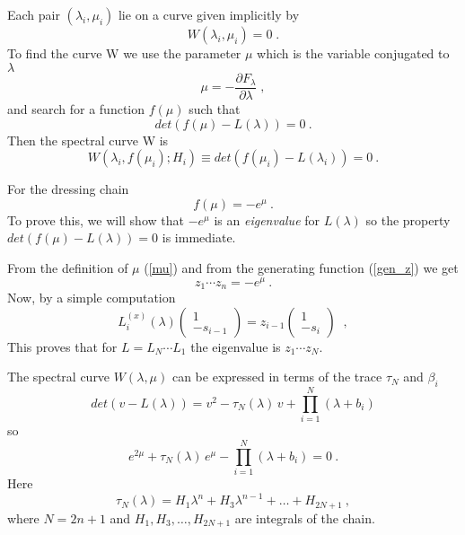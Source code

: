 \documentclass[a4paper,11pt]{article}
\begin{document}
Each pair $(\lambda_i,\mu_i)$ lie on a curve given implicitly by
\begin{equation}
\label{cu}
W(\lambda_i,\mu_i)=0\;.
\end{equation}
To find the curve W we use the parameter $\mu $ which is the variable
conjugated to $\lambda $
\begin{equation}
\label{mu}
\mu =-\frac{\partial F_{\lambda}}{\partial \lambda}\;,
\end{equation}
and search for a function $f(\mu )$ such that
\begin{equation}
\label{fmu}
det(f(\mu)-L(\lambda))=0 ~.
\end{equation}
Then the spectral curve W is
\begin{equation}
W(\lambda_i,f(\mu_i);{H_i})\equiv det(f(\mu_i)-L(\lambda_i))=0 ~.
\end{equation}

For the dressing chain
\begin{equation}
\label{f}
f(\mu)=-e^{\mu} ~.
\end{equation}
To prove this, we will show that $-e^{\mu}$ is an {\it eigenvalue} for
$L(\lambda)$ so the property $det(f(\mu)-L(\lambda))=0$ is immediate.

{}From the definition of $\mu$ (\ref{mu}) and from the generating function
(\ref{gen_z}) we get
\begin{equation}
\label{zpr}
z_1\cdots z_n=-e^{\mu} ~.
\end{equation}
Now, by a  simple computation
\begin{equation}
\label{eigenL}
L^{(x)}_i(\lambda) \left(\begin{array}{c}
          1   \\
           -s_{i-1}
         \end{array}\right )=z_{i-1}\left(\begin{array}{c}
          1   \\
           -s_{i}
         \end{array}\right )\;\;,
\end{equation}
This proves that for $L=L_N\cdots L_1$ the eigenvalue is $z_1\cdots z_N.$

The spectral curve $W(\lambda,\mu)$ can be expressed in terms of the trace
$\tau_N$ and $\beta_i$
\begin{equation}
\label{spec}
det(v-L(\lambda))=v^2-\tau_N(\lambda)\,v+\prod_{i=1}^N(\lambda+b_i)
\end{equation}
so
\begin{equation}
\label{Wdres}
e^{2\mu}+\tau_N(\lambda)\,e^{\mu}-\prod_{i=1}^N(\lambda+b_i)=0 ~.
\end{equation}
Here
\begin{equation}
\label{taun}
\tau _N(\lambda)=H_1\lambda^n+H_3\lambda^{n-1}+ \ldots + H_{2N+1}~,
\end{equation}
where $N=2n+1$ and $H_1, H_3,\ldots,H_{2N+1}$ are integrals of the chain.
\end{document}
